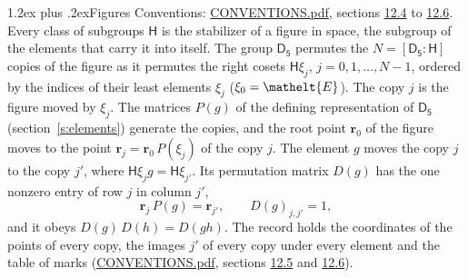 \documentclass[10pt,a4paper]{article}
\makeatletter
\renewcommand\section{\@startsection{section}{1}{\z@}{-3ex plus -1ex minus -.2ex}%
  {1.2ex plus .2ex}{\normalfont\large\sffamily\bfseries\color{parttitle}}}
\numberwithin{equation}{section}
\newcommand{\eltfont}[1]{{\let\sigma\eltsigma\mathelt{#1}}}
\newcommand{\grp}[1]{\mathsf{#1}}
\newcommand{\cls}[1]{\eltfont{#1}}
\newcommand{\pointr}{\mathbf{r}}
\makeatother
\begin{document}
\section{Figures}\label{s:permutation}
Conventions: \href{../../CONVENTIONS.pdf}{CONVENTIONS.pdf}, sections \href{../../CONVENTIONS.pdf\#conv.12.4}{12.4} to \href{../../CONVENTIONS.pdf\#conv.12.6}{12.6}.
Every class of subgroups $\grp{H}$ is the stabilizer of a figure in space, the subgroup of the elements that carry it into itself. \label{n:local.orbit.size}\label{n:element.coset.least}\label{n:index.coset}The group $\grp{D_{5}}$ permutes the $N = [\grp{D_{5}} : \grp{H}]$ copies of the figure as it permutes the right cosets $\grp{H}\xi_j$, $j = 0, 1, \dots, N - 1$, ordered by the indices of their least elements $\xi_j$ ($\xi_0 = \cls{E}$). The copy $j$ is the figure moved by $\xi_j$. The matrices $P(g)$ of the defining representation of $\grp{D_{5}}$ (section~\ref{s:elements}) generate the copies, and the root point $\pointr_0$ of the figure moves to the point $\pointr_j = \pointr_0\, P(\xi_j)$ of the copy $j$. \label{n:local.coset.image}The element $g$ moves the copy $j$ to the copy $j'$, where $\grp{H}\xi_j g = \grp{H}\xi_{j'}$. \label{n:local.matrix.permutation}Its permutation matrix $D(g)$ has the one nonzero entry of row $j$ in column $j'$,
\begin{equation}\label{e:perm.matrix}\pointr_j\, P(g) = \pointr_{j'}, \qquad D(g)_{j,j'} = 1,\end{equation}
and it obeys $D(g)\, D(h) = D(gh)$. The record holds the coordinates of the points of every copy, the images $j'$ of every copy under every element and the table of marks (\href{../../CONVENTIONS.pdf}{CONVENTIONS.pdf}, sections \href{../../CONVENTIONS.pdf\#conv.12.5}{12.5} and \href{../../CONVENTIONS.pdf\#conv.12.6}{12.6}).
\end{document}
